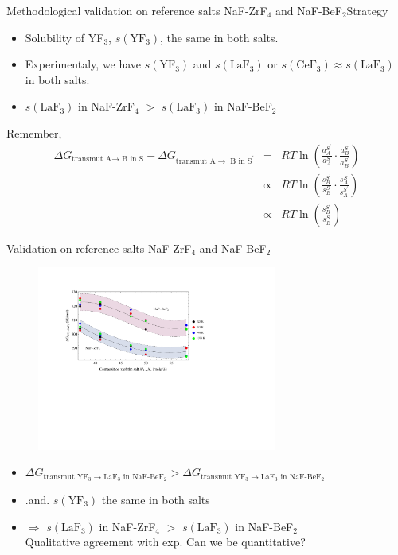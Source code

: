\documentclass{beamer}
\begin{document}
\begin{frame}{Methodological validation on reference salts NaF-ZrF$_4$ and NaF-BeF$_2$}{Strategy}
    \begin{itemize}
        \item Solubility of YF$_3$, $s(\text{YF}_3)$, the same in both salts.
        \item Experimentaly, we have $s(\text{YF}_3)$ and $s(\text{LaF}_3)$ or $s(\text{CeF}_3)\approx s(\text{LaF}_3)$ in both salts.
        \item $s(\text{LaF}_3)$ in NaF-ZrF$_4$ $>$ $s(\text{LaF}_3)$ in NaF-BeF$_2$
    \end{itemize}
    Remember,
    \begin{eqnarray}
        \Delta G_{\text{transmut A} \rightarrow\text{ B in S}} - \Delta G_{\text{transmut A} \rightarrow\text{ B in S}^\prime} &=& RT\ln\left( \frac{a_{A}^{S^\prime}}{a_A^S} \cdot \frac{a_B^S}{a_{B}^{S^\prime}}  \right)\nonumber \\
        &\propto& RT\ln\left( \frac{s_{B}^{S^\prime}}{s_B^S} \cdot \frac{s_A^S}{s_{A}^{S^\prime}}  \right)\nonumber \\
        &\propto& RT\ln\left( \frac{s_{B}^{S^\prime}}{s_B^S} \right) \nonumber
    \end{eqnarray}
\end{frame}
\begin{frame}{Validation on reference salts NaF-ZrF$_4$ and NaF-BeF$_2$}
    \begin{figure}
        \includegraphics[width=0.7\textwidth]{dGtransZrBe}
    \end{figure}
    \begin{itemize}
        \item $\Delta G_{\text{transmut YF}_3 \rightarrow \text{LaF}_3\text{ in NaF-BeF}_2} > \Delta G_{\text{transmut YF}_3 \rightarrow \text{LaF}_3\text{ in NaF-BeF}_2}$
        \item .and. $s(\text{YF}_3)$ the same in both salts
        \item $\Rightarrow$ $s(\text{LaF}_3)$ in NaF-ZrF$_4$ $>$ $s(\text{LaF}_3)$ in NaF-BeF$_2$ \\ Qualitative agreement with exp. Can we be quantitative?
    \end{itemize}
\end{frame}
\end{document}
